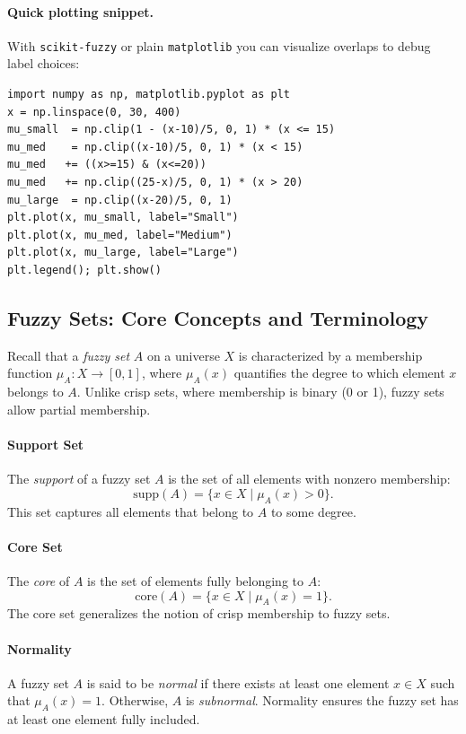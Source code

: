 \paragraph{Quick plotting snippet.} With \texttt{scikit-fuzzy} or plain \texttt{matplotlib} you can visualize overlaps to debug label choices:
\begin{verbatim}
import numpy as np, matplotlib.pyplot as plt
x = np.linspace(0, 30, 400)
mu_small  = np.clip(1 - (x-10)/5, 0, 1) * (x <= 15)
mu_med    = np.clip((x-10)/5, 0, 1) * (x < 15)
mu_med   += ((x>=15) & (x<=20))
mu_med   += np.clip((25-x)/5, 0, 1) * (x > 20)
mu_large  = np.clip((x-20)/5, 0, 1)
plt.plot(x, mu_small, label="Small")
plt.plot(x, mu_med, label="Medium")
plt.plot(x, mu_large, label="Large")
plt.legend(); plt.show()
\end{verbatim}

\subsection{Fuzzy Sets: Core Concepts and Terminology}
\label{sec:fuzzysets_fuzzy_sets_core_concepts_and_terminology}

Recall that a \emph{fuzzy set} \( A \) on a universe \( X \) is characterized by a membership function \(\mu_A: X \to [0,1]\), where \(\mu_A(x)\) quantifies the degree to which element \( x \) belongs to \( A \). Unlike crisp sets, where membership is binary (0 or 1), fuzzy sets allow partial membership.

\paragraph{Support Set} The \emph{support} of a fuzzy set \( A \) is the set of all elements with nonzero membership:
\[
    \mathrm{supp}(A) = \{ x \in X \mid \mu_A(x) > 0 \}.
\]
This set captures all elements that belong to \( A \) to some degree.

\paragraph{Core Set} The \emph{core} of \( A \) is the set of elements fully belonging to \( A \):
\[
    \mathrm{core}(A) = \{ x \in X \mid \mu_A(x) = 1 \}.
\]
The core set generalizes the notion of crisp membership to fuzzy sets.

\paragraph{Normality} A fuzzy set \( A \) is said to be \emph{normal} if there exists at least one element \( x \in X \) such that \(\mu_A(x) = 1\). Otherwise, \( A \) is \emph{subnormal}. Normality ensures the fuzzy set has at least one element fully included.


